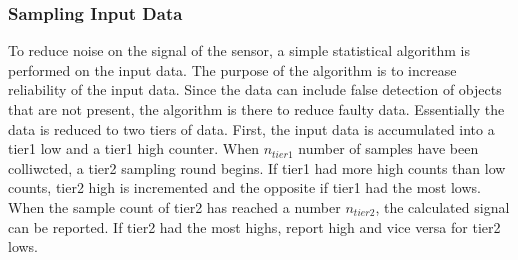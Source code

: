 \subsubsection{Sampling Input Data}

To reduce noise on the signal of the sensor, a simple statistical algorithm is
performed on the input data. The purpose of the algorithm is to increase reliability of the input data. Since the data can include false detection of objects that are not present, the algorithm is there to reduce  faulty data.  Essentially the data is reduced to two tiers
of data. First, the input data is accumulated into a tier1 low and a tier1 high
counter. When $n_{tier1}$ number of samples have been colliwcted, a tier2 sampling round begins. If tier1
had more high counts than low counts, tier2 high is incremented and the opposite if
tier1 had the most lows. When the sample count of tier2 has reached a number
$n_{tier2}$, the calculated signal can be reported. If tier2 had the most highs,
report high and vice versa for tier2 lows.



